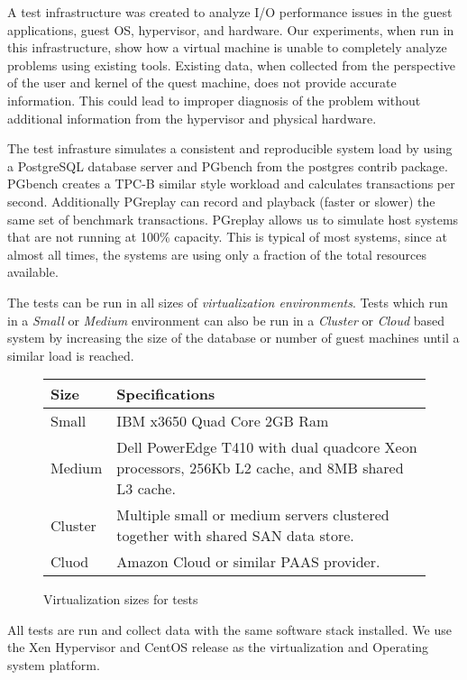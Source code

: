 A test infrastructure was created to analyze I/O performance issues in the guest applications, guest OS, hypervisor, and hardware.  Our experiments, when run in this infrastructure, show how a virtual machine is unable to completely analyze problems using existing tools.  Existing data, when collected from the perspective of the user and kernel of the quest machine, does not provide accurate information.  This could lead to improper diagnosis of the problem without additional information from the hypervisor and physical hardware.
\newline

The test infrasture simulates a consistent and reproducible system load by using a PostgreSQL database server and PGbench from the postgres contrib package. PGbench creates a TPC-B similar style workload and calculates transactions per second.   Additionally PGreplay can record and playback (faster or slower) the same set of benchmark transactions.  PGreplay allows us to simulate host systems that are not running at 100\% capacity.  This is typical of most systems, since at almost all times, the systems are using only a fraction of the total resources available.  
\newline

The tests can be run in all sizes of \emph{virtualization environments}.  Tests which run in a \emph{Small} or \emph{Medium} environment can also be run in a \emph{Cluster} or \emph{Cloud} based system by increasing the size of the database or number of guest machines until a similar load is reached.

\begin{figure}[h!]
\begin{tabular}{ l p{5cm} }
  Size & Specifications \\
  \hline
  Small & IBM x3650 Quad Core 2GB Ram \\
  Medium & Dell PowerEdge T410 with dual quadcore Xeon processors, 256Kb L2 cache, and 8MB shared L3 cache. \\
  Cluster & Multiple small or medium servers clustered together with shared SAN data store. \\
  Cluod & Amazon Cloud or similar PAAS provider. \\
\end{tabular}
\caption{Virtualization sizes for tests}
\label{fig:virtSize}
\end{figure}

All tests are run and collect data with the same software stack installed.  We use the Xen Hypervisor and CentOS release as the virtualization and Operating system platform.

